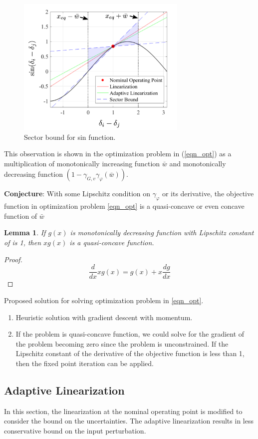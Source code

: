 \documentclass[journal]{IEEEtran}
\newtheorem{lemma}[theorem]{Lemma}
\begin{document}
\begin{figure}[!htbp]
	\centering
	\includegraphics[width=3.2in]{picture/sector_bound.png}
	\caption{Sector bound for sin function.}
	\label{fig_sector_bound}
\end{figure}

This observation is shown in the optimization problem in (\ref{eqn_opt}) as a multiplication of monotonically increasing function $\bar{w}$ and monotonically decreasing function $(1-\gamma_{G,v}\gamma_\varphi(\bar{w}))$.

\textbf{Conjecture}: With some Lipschitz condition on $\gamma_\varphi$ or its derivative, the objective function in optimization problem \ref{eqn_opt} is a quasi-concave or even concave function of $\bar{w}$

\begin{lemma} If $g(x)$ is monotonically decreasing function with Lipschitz constant of  is 1, then $xg(x)$ is a quasi-concave function. \end{lemma}
\begin{proof} 
$$\frac{d}{dx} xg(x)=g(x)+x\frac{dg}{dx}$$
\end{proof}

Proposed solution for solving optimization problem in \ref{eqn_opt}.
\begin{enumerate}
\item Heuristic solution with gradient descent with momentum.
\item If the problem is quasi-concave function, we could solve for the gradient of the problem becoming zero since the problem is unconstrained. If the Lipschitz constant of the derivative of the objective function is less than 1, then the fixed point iteration can be applied.
\end{enumerate}

\subsection{Adaptive Linearization}
In this section, the linearization at the nominal operating point is modified to consider the bound on the uncertainties. The adaptive linearization results in less conservative bound on the input perturbation.
\end{document}
